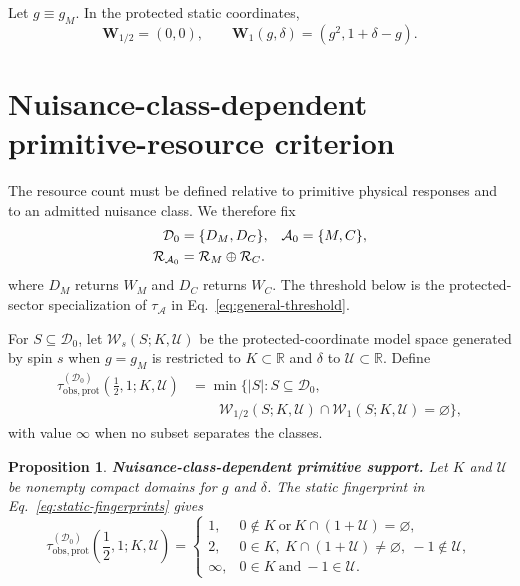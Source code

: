 \documentclass[12pt]{iopjournal}
\newcommand{\Dcal}{\mathcal D}
\newtheorem{proposition}{Proposition}[section]
\theoremstyle{definition}
\theoremstyle{remark}
\begin{document}
Let $g\equiv g_M$. In the protected static coordinates,
\begin{equation}
\boxed{
\bm W_{1/2}=(0,0),
\qquad
\bm W_1(g,\delta)=(g^2,1+\delta-g).
}
\label{eq:static-fingerprints}
\end{equation}

\section{Nuisance-class-dependent primitive-resource criterion}
\label{sec:minimality}

The resource count must be defined relative to primitive physical responses and to an admitted nuisance class. We therefore fix
\begin{align}
\Dcal_0&=\{D_M,D_C\},
&\mathcal A_0&=\{M,C\},
\notag\\
\mathcal R_{\mathcal A_0}&=\mathcal R_M\oplus\mathcal R_C.
\end{align}
where $D_M$ returns $W_M$ and $D_C$ returns $W_C$. The threshold below is the protected-sector specialization of $\tau_{\mathcal A}$ in Eq.~\eqref{eq:general-threshold}.

For $S\subseteq\Dcal_0$, let $\mathcal W_s(S;K,\mathcal U)$ be the protected-coordinate model space generated by spin $s$ when $g=g_M$ is restricted to $K\subset\mathbb R$ and $\delta$ to $\mathcal U\subset\mathbb R$. Define
\begin{equation}
\begin{aligned}
\tau_{\mathrm{obs,prot}}^{(\Dcal_0)}\!\left(\frac12,1;K,\mathcal U\right)
&=\min\bigl\{|S|:S\subseteq\Dcal_0,\\
&\qquad \mathcal W_{1/2}(S;K,\mathcal U)\cap\mathcal W_1(S;K,\mathcal U)=\varnothing\bigr\},
\end{aligned}
\label{eq:protected-threshold}
\end{equation}
with value $\infty$ when no subset separates the classes.

\begin{proposition}
\textbf{Nuisance-class-dependent primitive support.}
\label{prop:minimal}
Let $K$ and $\mathcal U$ be nonempty compact domains for $g$ and $\delta$. The static fingerprint in Eq.~\eqref{eq:static-fingerprints} gives
\begin{equation}
\boxed{
\tau_{\mathrm{obs,prot}}^{(\Dcal_0)}\!\left(\frac12,1;K,\mathcal U\right)
=
\begin{cases}
1, & 0\notin K\ \text{or}\ K\cap(1+\mathcal U)=\varnothing,\\[2pt]
2, & 0\in K,\ K\cap(1+\mathcal U)\ne\varnothing,\ -1\notin\mathcal U,\\[2pt]
\infty, & 0\in K\ \text{and}\ -1\in\mathcal U.
\end{cases}}
\label{eq:tau-K}
\end{equation}
\end{proposition}
\end{document}
